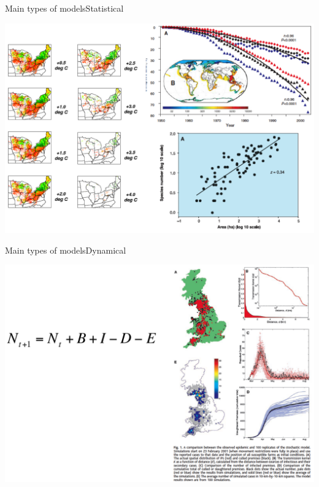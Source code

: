 \documentclass{eecslides}
\begin{document}
	\begin{frame}{Main types of models}{Statistical}

		\begin{center}
			\includegraphics[height=0.75\textheight]{statistical_model}
		\end{center}

	\end{frame}


	\begin{frame}{Main types of models}{Dynamical}
		\begin{center}
			\includegraphics[height=0.75\textheight]{dynamic_model}
		\end{center}
	\end{frame}

\end{document}
